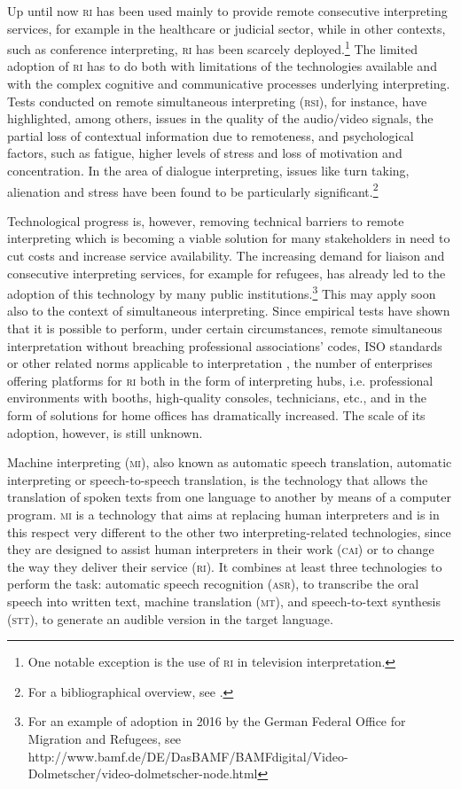\documentclass[output=paper]{langsci/langscibook}
\begin{document}
Up until now \textsc{ri} has been used mainly to provide remote consecutive interpreting services, for example in the healthcare or judicial sector, while in other contexts, such as conference interpreting, \textsc{ri} has been scarcely deployed.\footnote{One notable exception is the use of \textsc{ri} in television interpretation.} The limited adoption of \textsc{ri} has to do both with limitations of the technologies available and with the complex cognitive and communicative processes underlying interpreting. Tests conducted on remote simultaneous interpreting (\textsc{rsi}), for instance, have highlighted, among others, issues in the quality of the audio/video signals, the partial loss of contextual information due to remoteness, and psychological factors, such as fatigue, higher levels of stress and loss of motivation and concentration. In the area of dialogue interpreting, issues like turn taking, alienation and stress have been found to be particularly significant.\footnote{For a bibliographical overview, see \citet{Andres2009}.}
 
Technological progress is, however, removing technical barriers to remote interpreting which is becoming a viable solution for many stakeholders in need to cut costs and increase service availability. The increasing demand for liaison and consecutive interpreting services, for example for refugees, has already led to the adoption of this technology by many public institutions.\footnote{For an example of adoption in 2016 by the German Federal Office for Migration and Refugees, see http://www.bamf.de/DE/DasBAMF/BAMFdigital/Video-Dolmetscher/video-dolmetscher-node.html} This may apply soon also to the context of simultaneous interpreting. Since empirical tests have shown that it is possible to perform, under certain circumstances, remote simultaneous interpretation without breaching professional associations’ codes, ISO standards or other related norms applicable to interpretation \citep[202]{Causo2011b}, the number of enterprises offering platforms for \textsc{ri} both in the form of interpreting hubs, i.e. professional environments with booths, high-quality consoles, technicians, etc., and in the form of solutions for home offices has dramatically increased. The scale of its adoption, however, is still unknown.   
 
Machine interpreting (\textsc{mi}), also known as automatic speech translation, automatic interpreting or speech-to-speech translation, is the technology that allows the translation of spoken texts from one language to another by means of a computer program. \textsc{mi} is a technology that aims at replacing human interpreters and is in this respect very different to the other two interpreting-related technologies, since they are designed to assist human interpreters in their work (\textsc{cai}) or to change the way they deliver their service (\textsc{ri}). It combines at least three technologies to perform the task: automatic speech recognition (\textsc{asr}), to transcribe the oral speech into written text, machine translation (\textsc{mt}), and speech-to-text synthesis (\textsc{stt}), to generate an audible version in the target language. 
 
\end{document}
